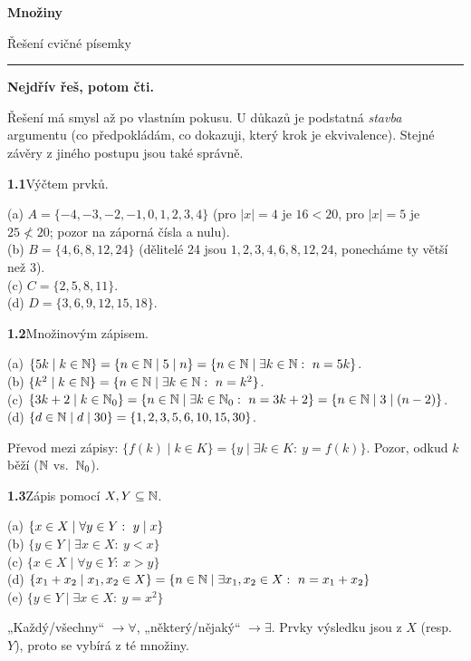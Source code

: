 \documentclass[11pt,a4paper]{article}
\newcommand{\zad}[2]{\par\Needspace*{4cm}\vspace{1.1em}\noindent\textcolor{accent}{\sffamily\bfseries #1}\enspace #2\par}
\begin{document}
{\sffamily\bfseries\fontsize{25}{28}\selectfont\color{accent} Množiny}\par
\vspace{2pt}
{\sffamily\large\color{muted} Řešení cvičné písemky}\par
\vspace{10pt}
{\color{rulegray}\rule{\linewidth}{0.6pt}}\par
\vspace{8pt}

\begin{varovani}
{\sffamily\bfseries\small Nejdřív řeš, potom čti.}\par\vspace{2pt}
Řešení má smysl až po vlastním pokusu. U důkazů je podstatná \emph{stavba} argumentu (co předpokládám, co dokazuji, který krok je ekvivalence). Stejné závěry z jiného postupu jsou také správně.
\end{varovani}


\zad{1.1}{Výčtem prvků.}
\begin{reseni}
(a) $A=\{-4,-3,-2,-1,0,1,2,3,4\}$ (pro $|x|=4$ je $16<20$, pro $|x|=5$ je $25\not<20$; pozor na záporná čísla a nulu).\\
(b) $B=\{4,6,8,12,24\}$ (dělitelé 24 jsou $1,2,3,4,6,8,12,24$, ponecháme ty větší než 3).\\
(c) $C=\{2,5,8,11\}$.\\
(d) $D=\{3,6,9,12,15,18\}$.
\end{reseni}

\zad{1.2}{Množinovým zápisem.}
\begin{reseni}
(a) $\{5k\mid k\in\mathbb N\}=\{n\in\mathbb N\mid 5\mathrel{\mid} n\}=\{n\in\mathbb N\mid\exists k\in\mathbb N:\ n=5k\}$.\\
(b) $\{k^2\mid k\in\mathbb N\}=\{n\in\mathbb N\mid\exists k\in\mathbb N:\ n=k^2\}$.\\
(c) $\{3k+2\mid k\in\mathbb N_0\}=\{n\in\mathbb N\mid\exists k\in\mathbb N_0:\ n=3k+2\}=\{n\in\mathbb N\mid 3\mathrel{\mid}(n-2)\}$.\\
(d) $\{d\in\mathbb N\mid d\mathrel{\mid} 30\}=\{1,2,3,5,6,10,15,30\}$.

\smallskip
{\sffamily\footnotesize\color{muted}Převod mezi zápisy: $\{f(k)\mid k\in K\}=\{y\mid\exists k\in K:\ y=f(k)\}$. Pozor, odkud $k$ běží ($\mathbb N$ vs.\ $\mathbb N_0$).}
\end{reseni}

\zad{1.3}{Zápis pomocí $X,Y\subseteq\mathbb N$.}
\begin{reseni}
(a) $\{x\in X\mid\forall y\in Y:\ y\mathrel{\mid} x\}$\\
(b) $\{y\in Y\mid\exists x\in X:\ y<x\}$\\
(c) $\{x\in X\mid\forall y\in Y:\ x>y\}$\\
(d) $\{x_1+x_2\mid x_1,x_2\in X\}=\{n\in\mathbb N\mid\exists x_1,x_2\in X:\ n=x_1+x_2\}$\\
(e) $\{y\in Y\mid\exists x\in X:\ y=x^2\}$

\smallskip
{\sffamily\footnotesize\color{muted}„Každý/všechny“ $\to\forall$, „některý/nějaký“ $\to\exists$. Prvky výsledku jsou z $X$ (resp.\ $Y$), proto se vybírá z té množiny.}
\end{reseni}
\end{document}

